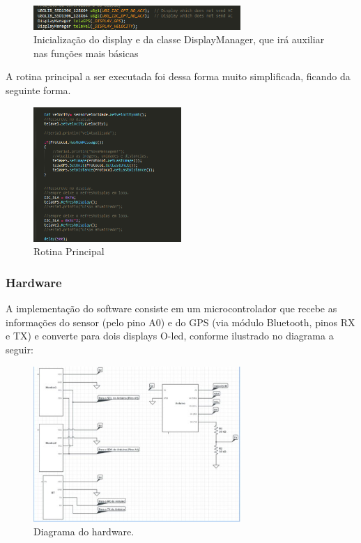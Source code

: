 	\graphicspath{{figuras/}}
	\begin{figure}[H]
		\centering
		\includegraphics[width=0.7\textwidth]{embarcado4.png}
		\caption{Inicialização do display e da classe DisplayManager, que irá auxiliar nas funções mais básicas}
		\label{img:embarcado4}
	\end{figure}

	A rotina principal a ser executada foi dessa forma muito simplificada, ficando da seguinte forma.
	\graphicspath{{figuras/}}
	\begin{figure}[H]
		\centering
		\includegraphics[width=0.5\textwidth]{embarcado5.png}
		\caption{Rotina Principal}
		\label{img:embarcado5}
	\end{figure}

	\subsubsection{Hardware}
	A implementação do software consiste em um microcontrolador que recebe as informações do sensor (pelo pino A0) e do GPS (via módulo Bluetooth, pinos RX e TX) e converte para dois displays O-led, conforme ilustrado no diagrama a seguir:

	\graphicspath{{figuras/}}
	\begin{figure}[H]
		\centering
		\includegraphics[width=0.7\textwidth]{embarcado6.jpg}
		\caption{Diagrama do hardware.}
		\label{img:embarcado6}
	\end{figure}

